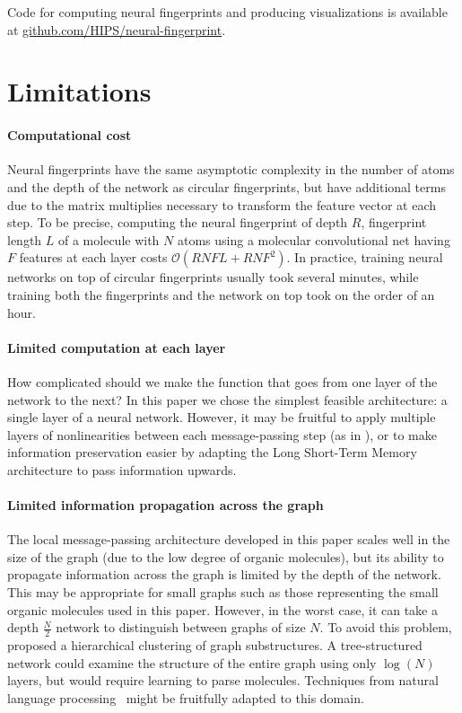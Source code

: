 \documentclass{article}
\newcommand{\citep}{\cite}
\newcommand{\citet}{\cite}
\begin{document}
Code for computing neural fingerprints and producing visualizations is available at \url{github.com/HIPS/neural-fingerprint}.

\section{Limitations}

\paragraph{Computational cost}
Neural fingerprints have the same asymptotic complexity in the number of atoms and the depth of the network as circular fingerprints, but have additional terms due to the matrix multiplies necessary to transform the feature vector at each step.
To be precise, computing the neural fingerprint of depth $R$, fingerprint length $L$ of a molecule with $N$ atoms using a molecular convolutional net having $F$ features at each layer costs $\mathcal{O}(RNFL + RNF^2)$.
In practice, training neural networks on top of circular fingerprints usually took several minutes, while training both the fingerprints and the network on top took on the order of an hour.

\paragraph{Limited computation at each layer}
How complicated should we make the function that goes from one layer of the network to the next?
In this paper we chose the simplest feasible architecture: a single layer of a neural network.
However, it may be fruitful to apply multiple layers of nonlinearities between each message-passing step (as in \cite{graphnn2009}), or to make information preservation easier by adapting the Long Short-Term Memory~\citep{hochreiter1997long} architecture to pass information upwards.

\paragraph{Limited information propagation across the graph}
The local message-passing architecture developed in this paper scales well in the size of the graph (due to the low degree of organic molecules), but its ability to propagate information across the graph is limited by the depth of the network.
This may be appropriate for small graphs such as those representing the small organic molecules used in this paper.
However, in the worst case, it can take a depth $\frac{N}{2}$ network to distinguish between graphs of size $N$.
To avoid this problem, \citet{bruna2013spectral} proposed a hierarchical clustering of graph substructures.
A tree-structured network could examine the structure of the entire graph using only $\log(N)$ layers, but would require learning to parse molecules.
Techniques from natural language processing~\citep{tai2015improved} might be fruitfully adapted to this domain.
\end{document}
